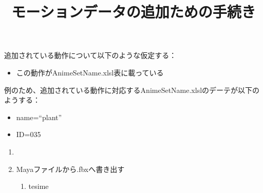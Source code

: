\documentclass[a4paper]{report}
\title{モーションデータの追加ための手続き}
\newcommand{\tname}{{\ttfamily AnimeSetName.xlsl}}
\begin{document}
\maketitle
追加されている動作について以下のような仮定する：
\begin{itemize}
	\item この動作が{\ttfamily AnimeSetName.xlsl}表に載っている
\end{itemize}
例のため、追加されている動作に対応する\tname のデーテが以下のようする：
\begin{itemize}
	\item {\ttfamily name=``plant''}
	\item {\ttfamily ID=035}
\end{itemize}
\begin{enumerate}
	\item 
	\item Mayaファイルから.fbxへ書き出す\begin{enumerate}
			\item tesime
		\end{enumerate}
\end{enumerate}
\end{document}
